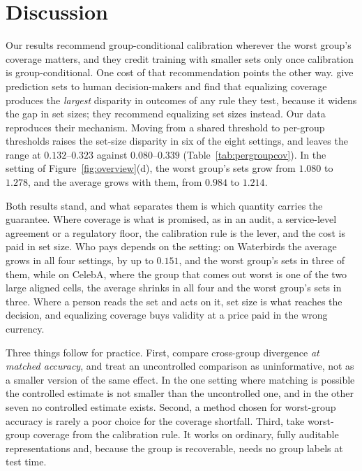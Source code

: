 \documentclass[pdflatex,sn-basic]{sn-jnl}%
\theoremstyle{thmstyleone}%
\begin{document}
\section{Discussion}
\label{sec:discussion}

Our results recommend group-conditional calibration wherever the worst group's coverage
matters, and they credit training with smaller sets only once calibration is group-conditional.
One cost of that recommendation points the other way.
\citet{cresswell2024} give prediction sets to human decision-makers and find that
equalizing coverage produces the \emph{largest} disparity in outcomes of any rule they
test, because it widens the gap in set sizes; they recommend equalizing set sizes instead. Our
data reproduces their mechanism. Moving from a shared threshold to per-group thresholds raises the
set-size disparity in six of the eight settings, and leaves the range at $0.132$--$0.323$ against
$0.080$--$0.339$ (Table~\ref{tab:pergroupcov}). In the setting of Figure~\ref{fig:overview}(d), the
worst group's sets grow from $1.080$ to $1.278$, and the average grows with them, from $0.984$ to
$1.214$.

Both results stand, and what
separates them is which quantity carries the guarantee. Where coverage is what is promised, as in an
audit, a service-level agreement or a regulatory floor, the calibration rule is the lever, and the
cost is paid in set size. Who pays depends on the setting: on Waterbirds the average grows in all
four settings, by up to $0.151$, and the worst group's sets in three of them, while on CelebA,
where the group that comes out worst is one of the two large aligned cells, the average shrinks in
all four and the worst group's sets in three. Where a person reads the set and acts
on it, set size is what reaches the decision, and equalizing coverage buys validity at a price paid
in the wrong currency.

Three things follow for practice. First, compare cross-group divergence \emph{at matched
accuracy}, and treat an uncontrolled comparison as uninformative, not as a smaller version of the
same effect. In the one setting where matching is possible the controlled estimate is not smaller
than the uncontrolled one, and in the other seven no controlled estimate exists. Second, a method
chosen for worst-group accuracy is rarely a poor choice for the coverage shortfall. Third, take
worst-group coverage from the calibration rule. It works on ordinary, fully auditable
representations and, because the group is recoverable, needs no group labels at test time.
\end{document}
